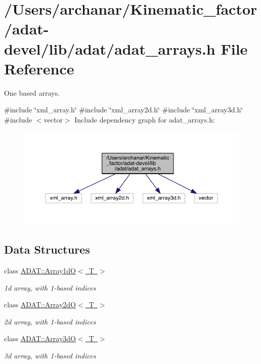 \hypertarget{adat-devel_2lib_2adat_2adat__arrays_8h}{}\section{/\+Users/archanar/\+Kinematic\+\_\+factor/adat-\/devel/lib/adat/adat\+\_\+arrays.h File Reference}
\label{adat-devel_2lib_2adat_2adat__arrays_8h}


One based arrays.  


{\ttfamily \#include \char`\"{}xml\+\_\+array.\+h\char`\"{}}\newline
{\ttfamily \#include \char`\"{}xml\+\_\+array2d.\+h\char`\"{}}\newline
{\ttfamily \#include \char`\"{}xml\+\_\+array3d.\+h\char`\"{}}\newline
{\ttfamily \#include $<$vector$>$}\newline
Include dependency graph for adat\+\_\+arrays.\+h\+:
\nopagebreak
\begin{figure}[H]
\begin{center}
\leavevmode
\includegraphics[width=350pt]{d8/d60/adat-devel_2lib_2adat_2adat__arrays_8h__incl}
\end{center}
\end{figure}
\subsection*{Data Structures}
\begin{DoxyCompactItemize}
\item 
class \mbox{\hyperlink{classADAT_1_1Array1dO}{A\+D\+A\+T\+::\+Array1d\+O$<$ T $>$}}
\begin{DoxyCompactList}\small\item\em 1d array, with 1-\/based indices \end{DoxyCompactList}\item 
class \mbox{\hyperlink{classADAT_1_1Array2dO}{A\+D\+A\+T\+::\+Array2d\+O$<$ T $>$}}
\begin{DoxyCompactList}\small\item\em 2d array, with 1-\/based indices \end{DoxyCompactList}\item 
class \mbox{\hyperlink{classADAT_1_1Array3dO}{A\+D\+A\+T\+::\+Array3d\+O$<$ T $>$}}
\begin{DoxyCompactList}\small\item\em 3d array, with 1-\/based indices \end{DoxyCompactList}\end{DoxyCompactItemize}
